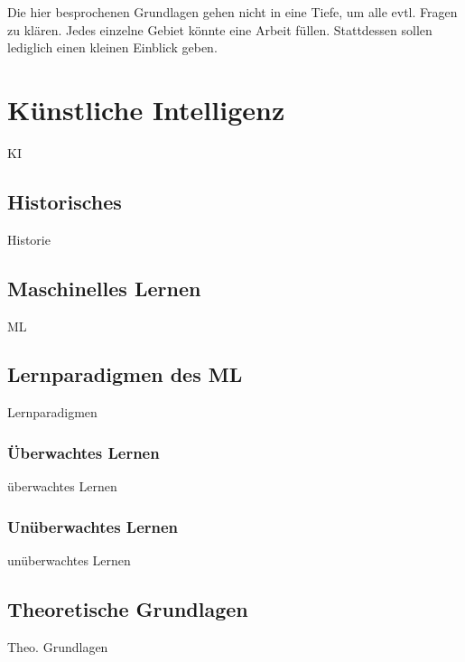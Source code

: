 Die hier besprochenen Grundlagen gehen nicht in eine Tiefe, um alle evtl. Fragen zu klären. Jedes einzelne Gebiet könnte eine Arbeit füllen. Stattdessen sollen lediglich einen kleinen Einblick geben.
\section{Künstliche Intelligenz}
KI

\subsection{Historisches}
Historie

\subsection{Maschinelles Lernen}
ML

\subsection{Lernparadigmen des ML}
Lernparadigmen

\subsubsection{Überwachtes Lernen}
überwachtes Lernen

\subsubsection{Unüberwachtes Lernen}
unüberwachtes Lernen

\subsection{Theoretische Grundlagen}
Theo. Grundlagen




